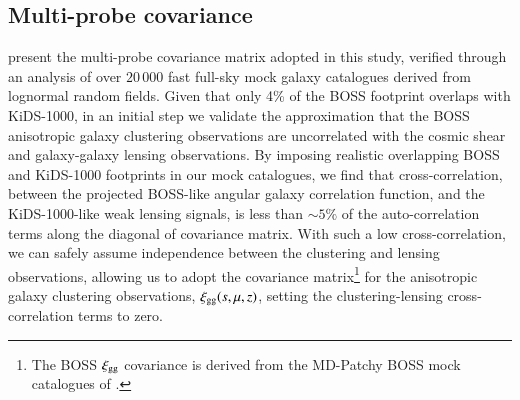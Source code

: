 \subsection{Multi-probe covariance}
\label{sec:Cov}
\citet{joachimi/etal:inprep} present the multi-probe covariance matrix adopted in this study, verified through an analysis of over $20\,000$ fast full-sky mock galaxy catalogues derived from lognormal random fields.   Given that only 4\% of the BOSS footprint overlaps with KiDS-1000, in an initial step we validate the approximation that the BOSS anisotropic galaxy clustering observations are uncorrelated with the cosmic shear and galaxy-galaxy lensing observations.   By imposing realistic overlapping BOSS and KiDS-1000 footprints in our mock catalogues, we find that cross-correlation, between the projected BOSS-like angular galaxy correlation function, and the KiDS-1000-like weak lensing signals, is less than $\sim\!5\%$ of the auto-correlation terms along the diagonal of covariance matrix.  With such a low cross-correlation, we can safely assume independence between the clustering and lensing observations, allowing us to adopt the \citet{sanchez/etal:2017} covariance matrix\footnote{The BOSS $\xi_{\rm gg}$ covariance is derived from the {\sc MD-Patchy} BOSS mock catalogues of \citet{kitaura/etal:2016}.} for the anisotropic galaxy clustering observations, $\xi_{\rm gg}(s,\mu,z)$, setting the clustering-lensing cross-correlation terms to zero.   

